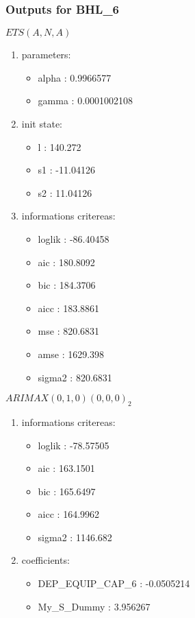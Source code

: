 \documentclass[10pt,a4paper]{article}\usepackage[]{graphicx}\usepackage[]{color}
\newcommand{\AaA}{\_}
\begin{document}
\newpage
\subsubsection{Outputs for BHL\AaA 6}
\begin{multicols}{2}


$ ETS(A,N,A) $
\begin{enumerate}
\item parameters:
\begin{itemize}
\item  alpha :  0.9966577 
\item  gamma :  0.0001002108 
\end{itemize}
\item init state:
\begin{itemize}
\item  l :  140.272 
\item  s1 :  -11.04126 
\item  s2 :  11.04126 
\end{itemize}
\item informations critereas:
\begin{itemize}
\item  loglik :  -86.40458 
\item  aic :  180.8092 
\item  bic :  184.3706 
\item  aicc :  183.8861 
\item  mse :  820.6831 
\item  amse :  1629.398 
\item  sigma2 :  820.6831 
\end{itemize}
\end{enumerate}

\columnbreak


 $ARIMAX(0,1,0)(0,0,0)_{2}$ 
\begin{enumerate}
\item informations critereas:
\begin{itemize}
\item  loglik :  -78.57505 
\item  aic :  163.1501 
\item  bic :  165.6497 
\item  aicc :  164.9962 
\item  sigma2 :  1146.682 
\end{itemize}

\item coefficients:
\begin{itemize}
\item  DEP\AaA EQUIP\AaA CAP\AaA 6 :  -0.0505214 
\item  My_S_Dummy :  3.956267 
\end{itemize}
\end{enumerate}
\end{multicols}
\end{document}
